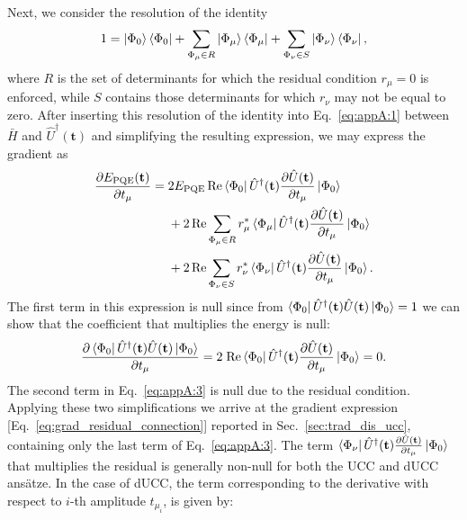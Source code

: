 \documentclass[aps,prx, reprint]{revtex4-2}
\begin{document}
Next, we consider the resolution of the identity
\begin{equation}
1 = \ket{\Phi_0}\bra{\Phi_0}
+ \sum_{\Phi_\mu \in R} \ket{\Phi_\mu}\bra{\Phi_\mu}
+ \sum_{\Phi_\nu \in S} \ket{\Phi_\nu}
\bra{\Phi_\nu},
\end{equation}
where $R$ is the set of determinants for which the residual condition $r_\mu = 0$ is enforced, while $S$ contains those determinants for which $r_\nu$ may not be equal to zero.
After inserting this resolution of the identity into Eq.~\eqref{eq:appA:1} between $\bar{H}$ and $\hat{U}^\dagger(\mathbf{t})$ and simplifying the resulting expression, we may express the gradient as
\begin{equation}
\label{eq:appA:3}
\begin{split}
\frac{\partial E_\mathrm{PQE}(\mathbf{t})}{\partial t_\mu}
 = \; &
2 E_\mathrm{PQE} \, \mathrm{Re}
\bra{\Phi_0} \hat{U}^\dagger(\mathbf{t}) \frac{\partial \hat{U}(\mathbf{t})}{\partial t_\mu}  \ket{\Phi_0} \\
& +
2 \, \mathrm{Re} \sum_{\Phi_\mu \in R}  r_\mu^* \bra{\Phi_\mu} \hat{U}^\dagger(\mathbf{t}) \frac{\partial \hat{U}(\mathbf{t})}{\partial t_\mu}  \ket{\Phi_0} \\
& +
2 \, \mathrm{Re} \sum_{\Phi_\nu \in S}
r_\nu^*
\bra{\Phi_\nu} \hat{U}^\dagger(\mathbf{t}) \frac{\partial \hat{U}(\mathbf{t})}{\partial t_\mu}  \ket{\Phi_0}.
\end{split}
\end{equation}
The first term in this expression is null since from $\bra{\Phi_0} \hat{U}^\dagger(\mathbf{t}) \hat{U}(\mathbf{t})\ket{\Phi_0} = 1$ we can show that the coefficient that multiplies the energy is null:
\begin{equation}
\frac{\partial \bra{\Phi_0} \hat{U}^\dagger(\mathbf{t}) \hat{U}(\mathbf{t})\ket{\Phi_0}}{\partial t_\mu} =
2 \; \mathrm{Re}\bra{\Phi_0} \hat{U}^\dagger(\mathbf{t}) \frac{\partial \hat{U}(\mathbf{t})}{\partial t_\mu} \ket{\Phi_0} = 0.
\end{equation}
The second term in Eq.~\eqref{eq:appA:3} is null due to the residual condition.
Applying these two simplifications we arrive at the gradient expression [Eq.~\eqref{eq:grad_residual_connection}] reported in Sec.~\ref{sec:trad_dis_ucc}, containing only the last term of Eq.~\eqref{eq:appA:3}.
The term $\bra{\Phi_\nu} \hat{U}^\dagger(\mathbf{t}) \frac{\partial \hat{U}(\mathbf{t})}{\partial t_\mu}  \ket{\Phi_0}$ that multiplies the residual is generally non-null for both the UCC and dUCC ans\"{a}tze.
In the case of dUCC, the term corresponding to the derivative with respect to $i$-th amplitude $t_{\mu_i}$, is given by:
\end{document}
